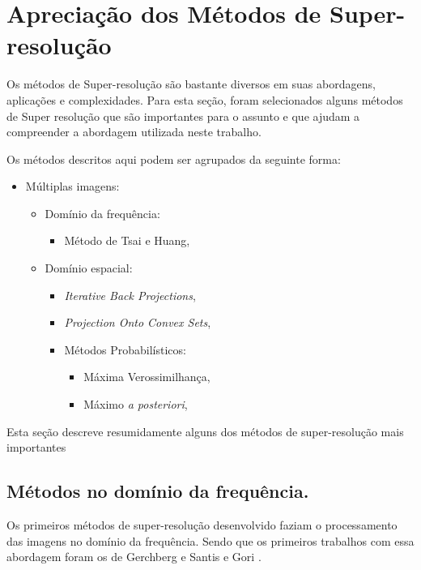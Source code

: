 \clearpage
\section{Apreciação dos Métodos de Super-resolução} 
\label{sec:srmetodos}
Os métodos de Super-resolução são bastante diversos em suas abordagens, aplicações e complexidades. Para esta seção, foram selecionados alguns métodos de Super resolução que são importantes para o assunto e que ajudam a compreender a abordagem utilizada neste trabalho.

Os métodos descritos aqui podem ser agrupados da seguinte forma:

\begin{itemize}
	\item Múltiplas imagens:
	\begin{itemize}
		\item Domínio da frequência:
		\begin{itemize}
			\item Método de Tsai e Huang,
		\end{itemize}
		\item Domínio espacial:
		\begin{itemize}
			\item \emph{Iterative Back Projections},
			\item \emph{Projection Onto Convex Sets},
			\item Métodos Probabilísticos:
			\begin{itemize}
				\item Máxima Verossimilhança,
				\item Máximo \emph{a posteriori},
			\end{itemize}
		\end{itemize}
	\end{itemize}
\end{itemize}

Esta seção descreve resumidamente alguns dos métodos de super-resolução mais importantes 

\subsection{Métodos no domínio da frequência.}

Os primeiros métodos de super-resolução desenvolvido faziam o processamento das imagens no domínio da frequência.
Sendo que os primeiros trabalhos com essa abordagem foram os de Gerchberg \cite{Gerchberg1974} e Santis e Gori \cite{de1975iterative}.

